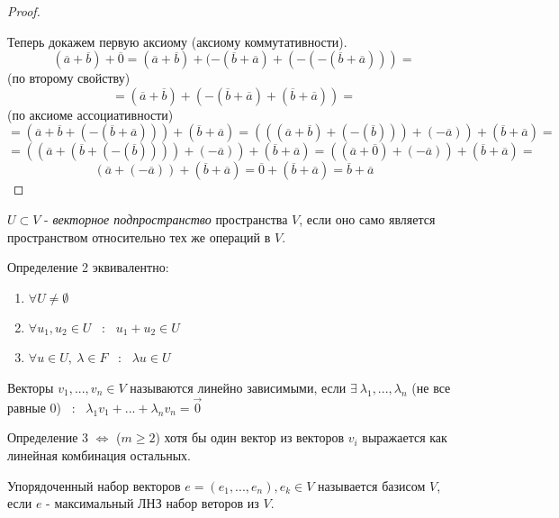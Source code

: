 \begin{definition}
\begin{proof}
\begin{enumerate}
      \end{enumerate}
      Теперь докажем первую аксиому (аксиому коммутативности).
      $$(\overline{a}+\overline{b})+\overline{0} = (\overline{a}+\overline{b})+(-(\overline{b}+\overline{a})+(-(-(\overline{b}+\overline{a}))) = $$
      (по второму свойству) 
      $$ = (\overline{a}+\overline{b})+(-(\overline{b}+\overline{a})+(\overline{b}+\overline{a})) = $$ 
      (по аксиоме ассоциативности) 
      $$=(\overline{a}+\overline{b}+(-(\overline{b}+\overline{a})))+(\overline{b}+\overline{a}) = (((\overline{a}+\overline{b})+(-(\overline{b})))+(-\overline{a}))+(\overline{b}+\overline{a}) = $$
      $$= ((\overline{a}+(\overline{b}+(-(\overline{b}))))+(-\overline{a}))+(\overline{b}+\overline{a}) =
      ((\overline{a}+\overline{0})+(-\overline{a}))+(\overline{b}+\overline{a}) =$$
      $$(\overline{a}+(-\overline{a}))+(\overline{b}+\overline{a})
      = \overline{0}+(\overline{b}+\overline{a}) = \overline{b}+\overline{a}$$
    \end{proof} 
  \end{definition}
  \begin{definition}
    $U \subset  V$ - \textit{векторное подпространство} пространства $V$, если оно само является пространством относительно тех же операций в $V$. 
  \end{definition}
  \begin{subtheorem}
    Определение 2 эквивалентно:
    \begin{enumerate}
      \item $\forall U\neq \emptyset $
      \item $\forall u_1, u_2 \in U$ \ : \  $u_1 + u_2 \in U$
      \item $\forall u \in U, \ \lambda \in F$ \ : \ $\lambda u\in U$
    \end{enumerate}
  \end{subtheorem} 
  \begin{definition}
    Векторы $v_1,...,v_n \in V$ называются линейно зависимыми, если $\exists \ \lambda_1,..., \lambda_n$ (не все равные 0) \ : \ $\lambda_1v_1+...+\lambda_nv_n = \vec 0$
  \end{definition} 
  \begin{subtheorem}
    Определение 3 $\Longleftrightarrow $ ($m\geq 2$) хотя бы один вектор из векторов $v_i$ выражается как линейная комбинация остальных. 
  \end{subtheorem}
  \begin{definition}
    Упорядоченный набор векторов $e = (e_1,...,e_n), e_k \in V$ называется базисом $V$, если $e$ - максимальный ЛНЗ набор веторов из $V$.  
  \end{definition} 

